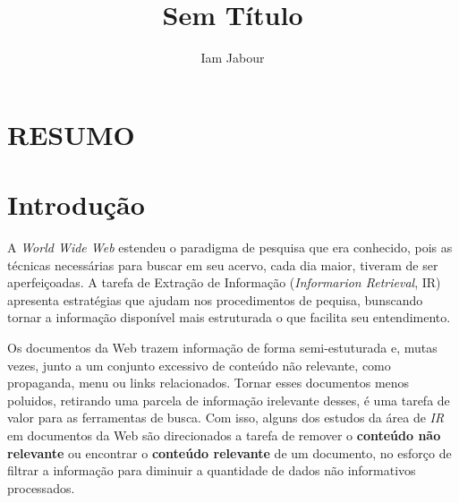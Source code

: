 \documentclass{acm_proc_article-sp}
\numberwithin{equation}{section}
\begin{document}
\title{Sem Título}

\author{
\alignauthor
Iam Jabour  
\and \alignauthor {}
}


\maketitle

\begin{abstract}


\end{abstract}

\section*{RESUMO}\normalsize %







\section{Introdução}

A {\it World Wide Web} estendeu o paradigma de pesquisa que era conhecido, pois
as técnicas necessárias para buscar em seu acervo, cada dia maior, tiveram 
de ser aperfeiçoadas.
	A tarefa de Extração de Informação ({\it Informarion Retrieval}, IR)
apresenta estratégias que ajudam nos procedimentos de pequisa, bunscando
tornar a informação disponível mais estruturada o que facilita seu entendimento.

Os documentos da Web trazem informação de forma semi-estuturada e,
	mutas vezes, junto a um conjunto excessivo de conteúdo não relevante, 
	como propaganda, menu ou links relacionados. Tornar esses documentos 
	menos poluidos, retirando uma parcela de informação irelevante desses, é 
	uma tarefa de valor para as ferramentas de busca.
	Com isso, 
	alguns dos estudos da área de {\it IR} em documentos da Web são 
	direcionados a tarefa de remover o {\bf conteúdo não relevante} ou 
	encontrar o {\bf conteúdo relevante} de um documento, no esforço de 
	filtrar a informação para diminuir a quantidade de dados não
	informativos processados.
\end{document}
